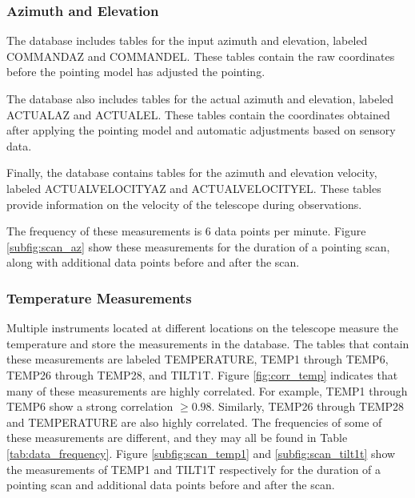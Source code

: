 \subsubsection{Azimuth and Elevation}
The database includes tables for the input azimuth and elevation, labeled COMMANDAZ and COMMANDEL.
These tables contain the raw coordinates before the pointing model has adjusted the pointing.

The database also includes tables for the actual azimuth and elevation, labeled ACTUALAZ and ACTUALEL.
These tables contain the coordinates obtained after applying the pointing model and automatic adjustments based on sensory data.

Finally, the database contains tables for the azimuth and elevation velocity, labeled ACTUALVELOCITYAZ and ACTUALVELOCITYEL.
These tables provide information on the velocity of the telescope during observations.

The frequency of these measurements is $6$ data points per minute.
Figure \ref{subfig:scan_az} show these measurements for the duration of a pointing scan, along with additional data points before and after the scan.


\subsubsection{Temperature Measurements}
Multiple instruments located at different locations on the telescope measure the temperature and store the measurements in the database.
The tables that contain these measurements are labeled TEMPERATURE, TEMP1 through TEMP6, TEMP26 through TEMP28, and TILT1T. 
Figure \ref{fig:corr_temp} indicates that many of these measurements are highly correlated.
For example, TEMP1 through TEMP6 show a strong correlation $\geq 0.98$.
Similarly, TEMP26 through TEMP28 and TEMPERATURE are also highly correlated.
The frequencies of some of these measurements are different, and they may all be found in Table \ref{tab:data_frequency}.
Figure \ref{subfig:scan_temp1} and \ref{subfig:scan_tilt1t} show the measurements of TEMP1 and TILT1T respectively
for the duration of a pointing scan and additional data points before and after the scan.


